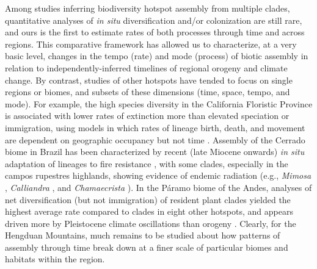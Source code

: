 


Among studies inferring biodiversity hotspot assembly from multiple
clades, quantitative analyses of \textit{in situ} diversification
and/or colonization are still rare, and ours is the first to estimate
rates of both processes through time and across regions. This
comparative framework has allowed us to characterize, at a very basic
level, changes in the tempo (rate) and mode (process) of biotic
assembly in relation to independently-inferred timelines of regional
orogeny and climate change. By contrast, studies of other hotspots
have tended to focus on single regions or biomes, and subsets of these
dimensions (time, space, tempo, and mode). For example, the high
species diversity in the California Floristic Province is associated
with lower rates of extinction more than elevated speciation or
immigration, using models in which rates of lineage birth, death, and
movement are dependent on geographic occupancy but not time
\citep{lancaster2013}. Assembly of the Cerrado biome in Brazil has
been characterized by recent (late Miocene onwards) \textit{in situ}
adaptation of lineages to fire resistance \citep{simon2009}, with some
clades, especially in the campos rupestres highlands, showing evidence
of endemic radiation (e.g., \textit{Mimosa}
\citep{koenen2013,simon2009}, \textit{Calliandra} \citep{souza2013},
and \textit{Chamaecrista} \citep{rando2015}). In the Páramo biome of
the Andes, analyses of net diversification (but not immigration) of
resident plant clades yielded the highest average rate compared to
clades in eight other hotspots, and appears driven more by Pleistocene
climate oscillations than orogeny \citep{Madrinan2013}. Clearly, for
the Hengduan Mountains, much remains to be studied about how patterns
of assembly through time break down at a finer scale of particular
biomes and habitats within the region.

